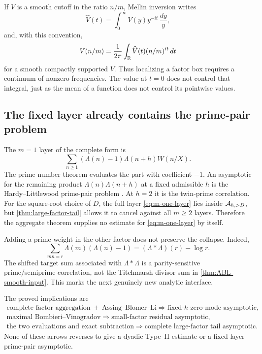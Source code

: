 If $V$ is a smooth cutoff in the ratio $n/m$, Mellin inversion writes
\begin{equation}\label{eq:Mellin-transform-convention}
 \widehat V(t)=\int_0^\infty V(y)y^{-it}\,\frac{dy}{y},
\end{equation}
and, with this convention,
\begin{equation}\label{eq:Mellin-inversion-scale}
 V(n/m)=\frac1{2\pi}\int_{\mathbb R}\widehat V(t)(n/m)^{it}\,dt
\end{equation}
for a smooth compactly supported $V$.  Thus localizing a factor
box requires a continuum of nonzero frequencies.  The value at $t=0$ does
not control that integral, just as the mean of a function does not control
its pointwise values.

\subsection{The fixed layer already contains the prime-pair problem}

The $m=1$ layer of the complete form is
\begin{equation}\label{eq:m-one-layer}
 \sum_{n\geq1}(\Lambda(n)-1)\Lambda(n+h)W(n/X).
\end{equation}
The prime number theorem evaluates the part with coefficient $-1$.  An
asymptotic for the remaining product $\Lambda(n)\Lambda(n+h)$ at a fixed
admissible $h$ is the Hardy--Littlewood prime-pair problem
\citep{HardyLittlewood1923}.  At $h=2$ it is the twin-prime correlation.
For the square-root choice of $D$, the full layer
\eqref{eq:m-one-layer} lies inside $\mathcal A_{h,>D}$, but
\cref{thm:large-factor-tail} allows it to cancel against all $m\geq2$
layers.  Therefore the aggregate theorem supplies no estimate for
\eqref{eq:m-one-layer} by itself.

Adding a prime weight in the other factor does not preserve the collapse.
Indeed,
\begin{equation}\label{eq:two-prime-source-convolution}
 \sum_{mn=r}\Lambda(m)(\Lambda(n)-1)
 =(\Lambda*\Lambda)(r)-\log r.
\end{equation}
The shifted target sum associated with $\Lambda*\Lambda$ is a
parity-sensitive prime/semiprime correlation, not the Titchmarsh divisor
sum in \cref{thm:ABL-smooth-input}.  This marks the next genuinely new
analytic interface.

\begin{remark}
The proved implications are
\[
 \begin{gathered}
 \text{complete factor aggregation}
 \ +\ \text{Assing--Blomer--Li}
 \Longrightarrow \text{fixed-$h$ zero-mode asymptotic},\\
 \text{maximal Bombieri--Vinogradov}
 \Longrightarrow \text{small-factor residual asymptotic},\\
 \text{the two evaluations and exact subtraction}
 \Longrightarrow \text{complete large-factor tail asymptotic}.
 \end{gathered}
\]
None of these arrows reverses to give a dyadic Type~II estimate or a
fixed-layer prime-pair asymptotic.
\end{remark}
